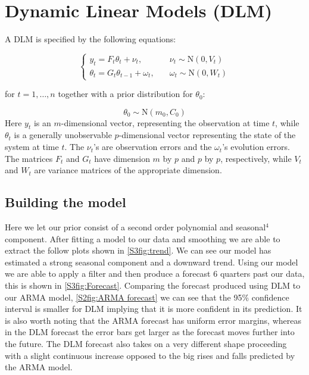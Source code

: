 \section{Dynamic Linear Models (DLM)}

A DLM is specified by the following equations:

\begin{equation*}
    \begin{cases}
        y_t = F_t\theta_t + \nu_t, \quad &\nu_t \sim \text{N}(0,V_t) \\
        \theta_t = G_t\theta_{t-1} + \omega_t, \quad &\omega_t \sim \text{N}(0, W_t)
    \end{cases}
\end{equation*}

for $t = 1, \dots, n$ together with a prior distribution for $\theta_0$:

\begin{equation*}
    \theta_0 \sim \text{N}(m_0, C_0)
\end{equation*}
\nline
Here $y_t$ is an $m$-dimensional vector, representing the observation at time $t$, while $\theta_t$ is a generally unobservable $p$-dimensional vector representing the state of the system at time $t$. The $\nu_t$’s are observation errors and the $\omega_t$’s evolution errors. The matrices $F_t$ and $G_t$ have dimension $m$ by $p$ and $p$ by $p$, respectively, while $V_t$ and $W_t$ are variance matrices of the appropriate dimension.

\subsection{Building the model}

Here we let our prior consist of a second order polynomial and seasonal$^4$ component.
\nline
After fitting a model to our data and smoothing we are able to extract the follow plots shown in \autoref{S3fig:trend}. We can see our model has estimated a strong seasonal component and a downward trend.
\nline
Using our model we are able to apply a filter and then produce a forecast 6 quarters past our data, this is shown in \autoref{S3fig:Forecast}. Comparing the forecast produced using DLM to our ARMA model, \autoref{S2fig:ARMA forecast} we can see that the 95\% confidence interval is smaller for DLM implying that it is more confident in its prediction. It is also worth noting that the ARMA forecast has uniform error margins, whereas in the DLM forecast the error bars get larger as the forecast moves further into the future. The DLM forecast also takes on a very different shape proceeding with a slight continuous increase opposed to the big rises and falls predicted by the ARMA model.

